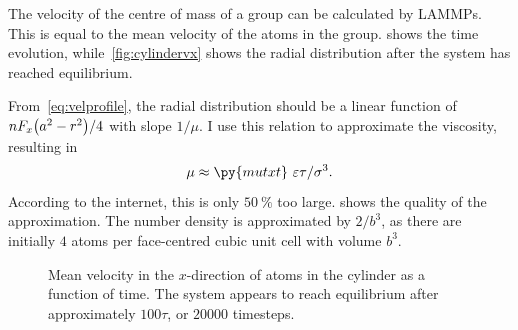 \documentclass[11pt,british,a4paper]{report}
\begin{document}
The velocity of the centre of mass of a group can be calculated by LAMMPs. This is equal to the mean velocity of the atoms in the group.  shows the time evolution, while~\vref{fig:cylindervx} shows the radial distribution after the system has reached equilibrium.


From~\vref{eq:velprofile}, the radial distribution should be a linear function of \(nF_x\qty(a^2-r^2)/4\) with slope \(1/\mu\). I use this relation to approximate the viscosity, resulting in
\begin{equation}
    \mu \approx \py{mutxt}\ \varepsilon\tau/\sigma^3. \label{eq:viscosity}
\end{equation}
According to the internet, this is only \(\SI{50}{\percent}\) too large.
 shows the quality of the approximation. The number density is approximated by \(2/b^3\), as there are initially \(4\) atoms per face-centred cubic unit cell with volume \(b^3\).
\begin{figure}[H]
    \centering
    \caption{Mean velocity in the \(x\)-direction of atoms in the cylinder as a function of time. The system appears to reach equilibrium after approximately \(100\tau\), or \(\num{20000}\) timesteps.}%
    \label{fig:cylindervxcm}
\end{figure}
\end{document}
